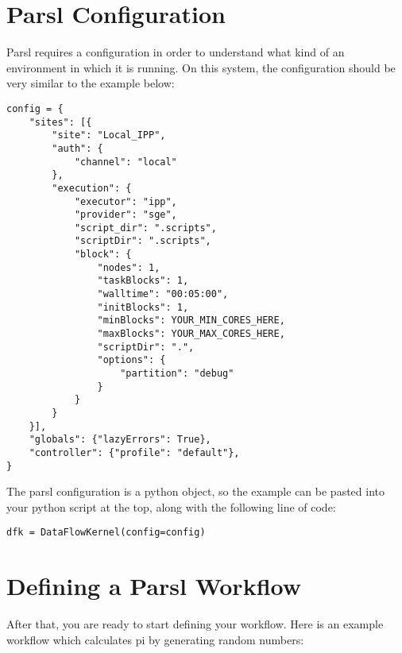 \documentclass[]{book}
\begin{document}
\section{Parsl Configuration}\label{parsl-configuration}

Parsl requires a configuration in order to understand what kind of an
environment in which it is running. On this system, the configuration
should be very similar to the example below:

\begin{verbatim}
config = {
    "sites": [{
        "site": "Local_IPP",
        "auth": {
            "channel": "local"
        },
        "execution": {
            "executor": "ipp",
            "provider": "sge",
            "script_dir": ".scripts",
            "scriptDir": ".scripts",
            "block": {
                "nodes": 1,
                "taskBlocks": 1,
                "walltime": "00:05:00",
                "initBlocks": 1,
                "minBlocks": YOUR_MIN_CORES_HERE,
                "maxBlocks": YOUR_MAX_CORES_HERE,
                "scriptDir": ".",
                "options": {
                    "partition": "debug"
                }
            }
        }
    }],
    "globals": {"lazyErrors": True},
    "controller": {"profile": "default"},
}
\end{verbatim}

The parsl configuration is a python object, so the example can be pasted
into your python script at the top, along with the following line of
code:

\begin{verbatim}
dfk = DataFlowKernel(config=config)
\end{verbatim}

\section{Defining a Parsl Workflow}\label{defining-a-parsl-workflow}

After that, you are ready to start defining your workflow. Here is an
example workflow which calculates pi by generating random numbers:
\end{document}
